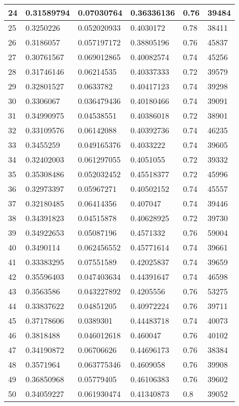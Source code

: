 \begin{longtable}{|l|l|l|l|l|l|}
24 & 0.31589794 & 0.07030764 & 0.36336136 & 0.76 & 39484 \\ \hline 
25 & 0.3250226 & 0.052020933 & 0.4030172 & 0.78 & 38411 \\ \hline 
26 & 0.3186057 & 0.057197172 & 0.38805196 & 0.76 & 45837 \\ \hline 
27 & 0.30761567 & 0.069012865 & 0.40082574 & 0.74 & 45256 \\ \hline 
28 & 0.31746146 & 0.06214535 & 0.40337333 & 0.72 & 39579 \\ \hline 
29 & 0.32801527 & 0.0633782 & 0.40417123 & 0.74 & 39298 \\ \hline 
30 & 0.3306067 & 0.036479436 & 0.40180466 & 0.74 & 39091 \\ \hline 
31 & 0.34990975 & 0.04538551 & 0.40386018 & 0.72 & 38901 \\ \hline 
32 & 0.33109576 & 0.06142088 & 0.40392736 & 0.74 & 46235 \\ \hline 
33 & 0.3455259 & 0.049165376 & 0.4033222 & 0.74 & 39605 \\ \hline 
34 & 0.32402003 & 0.061297055 & 0.4051055 & 0.72 & 39332 \\ \hline 
35 & 0.35308486 & 0.052032452 & 0.45518377 & 0.72 & 45996 \\ \hline 
36 & 0.32973397 & 0.05967271 & 0.40502152 & 0.74 & 45557 \\ \hline 
37 & 0.32180485 & 0.06414356 & 0.407047 & 0.74 & 39446 \\ \hline 
38 & 0.34391823 & 0.04515878 & 0.40628925 & 0.72 & 39730 \\ \hline 
39 & 0.34922653 & 0.05087196 & 0.4571332 & 0.76 & 59004 \\ \hline 
40 & 0.3490114 & 0.062456552 & 0.45771614 & 0.74 & 39661 \\ \hline 
41 & 0.33383295 & 0.07551589 & 0.42025837 & 0.74 & 39659 \\ \hline 
42 & 0.35596403 & 0.047403634 & 0.44391647 & 0.74 & 46598 \\ \hline 
43 & 0.3563586 & 0.043227892 & 0.4205556 & 0.76 & 53275 \\ \hline 
44 & 0.33837622 & 0.04851205 & 0.40972224 & 0.76 & 39711 \\ \hline 
45 & 0.37178606 & 0.0389301 & 0.44483718 & 0.74 & 40073 \\ \hline 
46 & 0.3818488 & 0.046012618 & 0.460047 & 0.76 & 40102 \\ \hline 
47 & 0.34190872 & 0.06706626 & 0.44696173 & 0.76 & 38384 \\ \hline 
48 & 0.3571964 & 0.063775346 & 0.4609058 & 0.76 & 39908 \\ \hline 
49 & 0.36850968 & 0.05779405 & 0.46106383 & 0.76 & 39602 \\ \hline 
50 & 0.34059227 & 0.061930474 & 0.41340873 & 0.8 & 39052 \\ \hline 
\end{longtable}